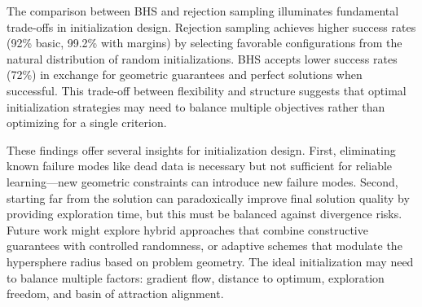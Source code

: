 The comparison between BHS and rejection sampling illuminates fundamental trade-offs in initialization design. Rejection sampling achieves higher success rates (92\% basic, 99.2\% with margins) by selecting favorable configurations from the natural distribution of random initializations. BHS accepts lower success rates (72\%) in exchange for geometric guarantees and perfect solutions when successful. This trade-off between flexibility and structure suggests that optimal initialization strategies may need to balance multiple objectives rather than optimizing for a single criterion.

These findings offer several insights for initialization design. First, eliminating known failure modes like dead data is necessary but not sufficient for reliable learning—new geometric constraints can introduce new failure modes. Second, starting far from the solution can paradoxically improve final solution quality by providing exploration time, but this must be balanced against divergence risks. Future work might explore hybrid approaches that combine constructive guarantees with controlled randomness, or adaptive schemes that modulate the hypersphere radius based on problem geometry. The ideal initialization may need to balance multiple factors: gradient flow, distance to optimum, exploration freedom, and basin of attraction alignment.

